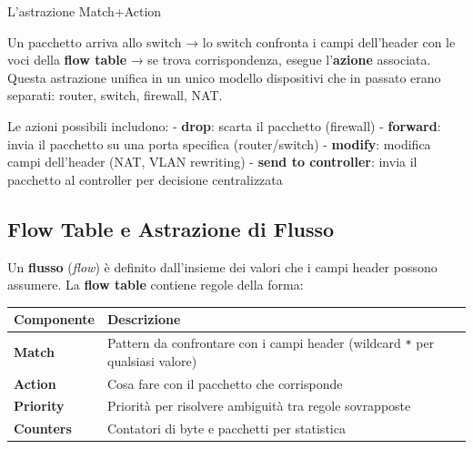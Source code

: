 \documentclass[
  italian,
  openany]{book}
\newcounter{none} %
\begin{document}
\begin{callouttip}{L’astrazione Match+Action}

Un pacchetto arriva allo switch → lo switch confronta i campi
dell'header con le voci della \textbf{flow table} → se trova
corrispondenza, esegue l'\textbf{azione} associata. Questa astrazione
unifica in un unico modello dispositivi che in passato erano separati:
router, switch, firewall, NAT.

\end{callouttip}

Le azioni possibili includono: - \textbf{drop}: scarta il pacchetto
(firewall) - \textbf{forward}: invia il pacchetto su una porta specifica
(router/switch) - \textbf{modify}: modifica campi dell'header (NAT, VLAN
rewriting) - \textbf{send to controller}: invia il pacchetto al
controller per decisione centralizzata

\subsection{Flow Table e Astrazione di
Flusso}\label{flow-table-e-astrazione-di-flusso}

Un \textbf{flusso} (\emph{flow}) è definito dall'insieme dei valori che
i campi header possono assumere. La \textbf{flow table} contiene regole
della forma:

{\def\LTcaptype{none} %
\begin{longtable}[]{@{}
  >{\raggedright\arraybackslash}p{}
  >{\raggedright\arraybackslash}p{}@{}}
\toprule\noalign{}
\begin{minipage}[b]{\linewidth}\raggedright
Componente
\end{minipage} & \begin{minipage}[b]{\linewidth}\raggedright
Descrizione
\end{minipage} \\
\midrule\noalign{}
\endhead
\bottomrule\noalign{}
\endlastfoot
\textbf{Match} & Pattern da confrontare con i campi header (wildcard
\texttt{*} per qualsiasi valore) \\
\textbf{Action} & Cosa fare con il pacchetto che corrisponde \\
\textbf{Priority} & Priorità per risolvere ambiguità tra regole
sovrapposte \\
\textbf{Counters} & Contatori di byte e pacchetti per statistica \\
\end{longtable}
}
\end{document}
